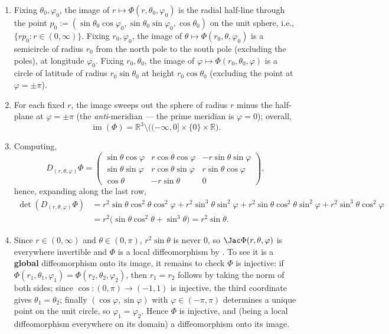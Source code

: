 \begin{exercisesolution}
\begin{enumerate}[label=\textbf{\arabic*.}]
  \item Fixing $\theta_0,\varphi_0$, the image of $r \mapsto \Phi(r,\theta_0,\varphi_0)$ is the
    radial half-line through the point $p_0 := (\sin\theta_0\cos\varphi_0,
    \sin\theta_0\sin\varphi_0, \cos\theta_0)$ on the unit sphere, i.e., $\{rp_0 : r \in
    (0,\infty)\}$. Fixing $r_0,\varphi_0$, the image of $\theta \mapsto \Phi(r_0,\theta,\varphi_0)$
    is a semicircle of radius $r_0$ from the north pole to the south pole (excluding the poles),
    at longitude $\varphi_0$. Fixing $r_0,\theta_0$, the image of $\varphi \mapsto
    \Phi(r_0,\theta_0,\varphi)$ is a circle of latitude of radius $r_0\sin\theta_0$ at height
    $r_0\cos\theta_0$ (excluding the point at $\varphi = \pm\pi$).
  \item For each fixed $r$, the image sweeps out the sphere of radius $r$ minus the half-plane
    at $\varphi = \pm\pi$ (the \emph{anti}-meridian --- the prime meridian is $\varphi = 0$);
    overall,
    \[\operatorname{im}(\Phi) = \mathbb{R}^3\setminus\big((-\infty,0]\times\{0\}\times\mathbb{R}\big).\]
  \item Computing,
    \[D_{(r,\theta,\varphi)}\Phi = \begin{pmatrix} \sin\theta\cos\varphi & r\cos\theta\cos\varphi & -r\sin\theta\sin\varphi \\ \sin\theta\sin\varphi & r\cos\theta\sin\varphi & r\sin\theta\cos\varphi \\ \cos\theta & -r\sin\theta & 0 \end{pmatrix},\]
    hence, expanding along the last row,
    \[\begin{aligned}
    \det(D_{(r,\theta,\varphi)}\Phi) &= r^2\sin\theta\cos^2\theta\cos^2\varphi+r^2\sin^3\theta\sin^2\varphi+r^2\sin\theta\cos^2\theta\sin^2\varphi+r^2\sin^3\theta\cos^2\varphi \\
    &= r^2\big(\sin\theta\cos^2\theta+\sin^3\theta\big) = r^2\sin\theta.
    \end{aligned}\]
  \item Since $r \in (0,\infty)$ and $\theta \in (0,\pi)$, $r^2\sin\theta$ is never $0$, so
    $\Jac\Phi(r,\theta,\varphi)$ is everywhere invertible and $\Phi$ is a local diffeomorphism by
    . To see it is a \textbf{global} diffeomorphism onto its
    image, it remains to check $\Phi$ is injective: if $\Phi(r_1,\theta_1,\varphi_1) =
    \Phi(r_2,\theta_2,\varphi_2)$, then $r_1=r_2$ follows by taking the norm of both sides; since
    $\cos : (0,\pi) \to (-1,1)$ is injective, the third coordinate gives $\theta_1=\theta_2$;
    finally $(\cos\varphi,\sin\varphi)$ with $\varphi \in (-\pi,\pi)$ determines a unique point on
    the unit circle, so $\varphi_1=\varphi_2$. Hence $\Phi$ is injective, and (being a local
    diffeomorphism everywhere on its domain) a diffeomorphism onto its image.
\end{enumerate}
\end{exercisesolution}
